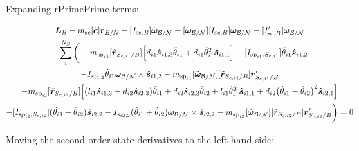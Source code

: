 \documentclass[paper]{aiaaNew}
\begin{document}
Expanding rPrimePrime terms:

\begin{multline}
\bm L_B - m_{\text{sc}} [\tilde{\bm c}] \ddot{\bm r}_{B/N} -[I_{\text{sc},B}] \dot{\bm\omega}_{\cal B/N} -[\bm{\tilde{\omega}}_{\cal B/N}] [I_{\text{sc},B}] \bm\omega_{\cal B/N} - [I'_{\text{sc},B}] \bm\omega_{\cal B/N}
\\
+ \sum\limits_{i}^{N_S}\bigg(
- m_{\text{sp}_{i1}} [\tilde{{\bm r}}_{S_{c,i1}/B}] \Big[d_{i1} \bm{\hat{s}}_{i1,3} \ddot{\theta}_{i1} + d_{i1} \dot{\theta}_{i1}^2 \bm{\hat{s}}_{i1,1} \Big]
-[I_{\text{sp}_{i1},S_{c,i1}}] \ddot{\theta}_{i1} \hat{\bm s}_{i1,2} 
\\-I_{s_{i1,2}} \dot{\theta}_{i1} \bm \omega_{\cal{B/N}} \times \hat{\bm s}_{i1,2} - m_{\text{sp}_{i1}} [\tilde{\bm\omega}_{\cal B/N}] [\tilde{{\bm r}}_{S_{c,i1}/B}] \bm{r}'_{S_{c,i1}/B}
\\
- m_{\text{sp}_{i2}} [\tilde{{\bm r}}_{S_{c,i2}/B}] \Big[(l_{i1} \bm{\hat{s}}_{i1,3} + d_{i2} \bm{\hat{s}}_{i2,3}) \ddot{\theta}_{i1} + d_{i2} \bm{\hat{s}}_{i2,3} \ddot{\theta}_{i2} + l_{i1} \dot{\theta}_{i1}^2 \bm{\hat{s}}_{i1,1} + d_{i2}\big(\dot{\theta}_{i1} + \dot{\theta}_{i2}\big)^2\bm{\hat{s}}_{i2,1}\Big]\\
-[I_{\text{sp}_{i2},S_{c,i2}}] (\ddot{\theta}_{i1}  + \ddot{\theta}_{i2})\hat{\bm s}_{i2,2} 
-I_{s_{i2,2}}  (\dot{\theta}_{i1}  + \dot{\theta}_{i2}) \bm \omega_{\cal{B/N}} \times \hat{\bm s}_{i2,2} - m_{\text{sp}_{i2}} [\tilde{\bm\omega}_{\cal B/N}] [\tilde{{\bm r}}_{S_{c,i2}/B}] \bm{r}'_{S_{c,i2}/B} \bigg) = 0
\end{multline}

Moving the second order state derivatives to the left hand side:
\end{document}
